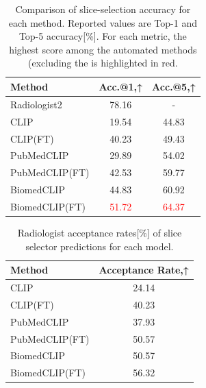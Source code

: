 \documentclass[bioengineering,article,submit,pdftex,moreauthors]{Definitions/mdpi}
\begin{document}
\begin{table}[ht]
  \centering
  \caption{Comparison of slice-selection accuracy for each method. 
  Reported values are Top-1 and Top-5 accuracy[\%]. 
  For each metric, the highest score among the automated methods (excluding the  is highlighted in red.}
  \label{tab:slice_extraction_accuracy}
  \begin{tabular}{lcc}
    \toprule
    Method                  & Acc.@1,↑      & Acc.@5,↑       \\
    \midrule
    Radiologist2            & 78.16       & -            \\
    CLIP                    & 19.54       & 44.83        \\
    CLIP(FT)                & 40.23       & 49.43        \\
    PubMedCLIP              & 29.89       & 54.02        \\
    PubMedCLIP(FT)          & 42.53       & 59.77        \\
    BiomedCLIP              & 44.83       & 60.92        \\
    BiomedCLIP(FT)          & \textcolor{red}{51.72} & \textcolor{red}{64.37}  \\
    \bottomrule
  \end{tabular}
\end{table}


\begin{table}[ht]
  \centering
  \caption{Radiologist acceptance rates[\%] of slice selector predictions for each model.}
  \label{tab:slice_selector_adoption}
  \begin{tabular}{lc}
    \toprule
    Method                  & Acceptance Rate,↑  \\
    \midrule
    CLIP                    & 24.14         \\
    CLIP(FT)                & 40.23         \\
    PubMedCLIP              & 37.93         \\
    PubMedCLIP(FT)          & 50.57         \\
    BiomedCLIP              & 50.57         \\
    BiomedCLIP(FT)          & 56.32         \\
    \bottomrule
  \end{tabular}
\end{table}
\end{document}

